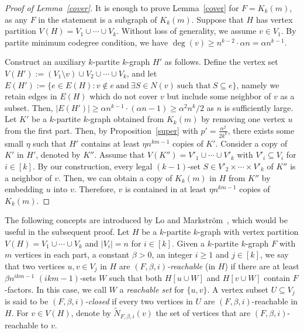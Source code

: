 \documentclass[11pt,a4paper]{article}
\theoremstyle{definition}
\begin{document}
\begin{proof}[Proof of Lemma~\ref{cover}]
    It is enough to prove Lemma~\ref{cover} for $F=K_k(m)$, as any $F$ in the statement is a subgraph of $K_k(m)$. Suppose that $H$ has vertex partition $V(H)=V_1\cup \cdots \cup V_k$. Without loss of generality, we assume $v\in V_1$. By partite minimum codegree condition, we have $\deg (v)\geq n^{k-2}\cdot \alpha n=\alpha n^{k-1}$. 
    
    Construct an auxiliary $k$-partite $k$-graph $H'$ as follows. Define the vertex set $V(H'):=(V_1\setminus v)\cup V_2\cup \cdots \cup V_k$, and let $E(H'):=\{e\in E(H): v\notin e \ {\text{and}}\ \exists S\in N(v)\ {\text{such that}}\ S\subseteq e\}$, namely we retain edges in $E(H)$ which do not cover $v$ but include some neighbor of $v$ as a subset. Then, $|E(H')|\geq \alpha n^{k-1}\cdot (\alpha n-1)\geq \alpha ^2 n^{k}/2$ as $n$ is sufficiently large. Let $K'$ be a $k$-partite $k$-graph obtained from $K_k(m)$ by removing one vertex $u$ from the first part. Then, by Proposition~\ref{super} with $p'=\frac{\alpha^2}{2k^k}$, there exists some small $\eta $ such that $H'$ contains at least $\eta n^{km-1}$ copies of $K'$. Consider a copy of $K'$ in $H'$, denoted by $K''$. Assume that $V(K'')=V'_1\cup \cdots \cup V'_k$ with $V'_i\subseteq V_i$ for $i\in [k]$. By our construction, every legal $(k-1)$-set $S\in V'_2\times \cdots \times V'_k$ of $K''$ is a neighbor of $v$. Then, we can obtain a copy of $K_k(m)$ in $H$ from $K''$ by embedding $u$ into $v$. Therefore, $v$ is contained in at least $\eta n^{km-1}$ copies of $K_k(m)$.

    
\end{proof}
  
The following concepts are introduced by Lo and Markstr\"{o}m~\cite{Lo2015}, which would be useful in the subsequent proof. Let $H$ be a $k$-partite $k$-graph with vertex partition $V(H)=V_1\cup \cdots \cup V_k$ and $|V_i|=n$ for $i\in [k]$. Given a $k$-partite $k$-graph $F$ with $m$ vertices in each part, a constant $\beta> 0$, an integer $i \ge 1$ and $j\in [k]$, we say that two vertices $u, v\in V_j$ in $H$ are \textit{$(F, \beta, i)$-reachable} (in $H$) if there are at least $\beta n^{ikm-1}$ $(ikm-1)$-sets $W$ such that both $H[u\cup W]$ and $H[v\cup W]$ contain $F$-factors. In this case, we call $W$ a \emph{reachable set} for $\{u,v\}$.
A vertex subset $U\subseteq V_j$ is said to be \emph{$(F, \beta, i)$-closed} if every two vertices in $U$ are $(F, \beta, i)$-reachable in $H$.
For $v\in V(H)$, denote by $\tilde{N}_{F,\beta, i}(v)$ the set of vertices that are $(F,\beta, i)$-reachable to $v$. 
\end{document}
